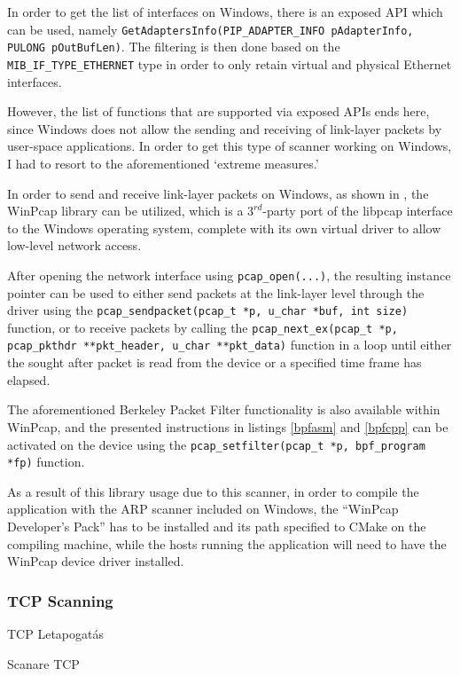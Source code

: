 \documentclass[a4paper,12pt]{article}
\newcommand\subsubsectionhu[1]{\addcontentsline{toc.hu}{subsubsection} {\protect\numberline{\thesubsubsection} #1}}
\newcommand\subsubsectionro[1]{\addcontentsline{toc.ro}{subsubsection} {\protect\numberline{\thesubsubsection} #1}}
\begin{document}
	In order to get the list of interfaces on Windows, there is an exposed API which can be used, namely \texttt{GetAdaptersInfo(PIP_ADAPTER_INFO pAdapterInfo, PULONG pOutBufLen)}. The filtering is then done based on the \texttt{MIB_IF_TYPE_ETHERNET} type in order to only retain virtual and physical Ethernet interfaces.
	
	However, the list of functions that are supported via exposed APIs ends here, since Windows does not allow the sending and receiving of link-layer packets by user-space applications. In order to get this type of scanner working on Windows, I had to resort to the aforementioned `extreme measures.'
	
	In order to send and receive link-layer packets on Windows, as shown in \cite{xing10}, the WinPcap library can be utilized, which is a $3^{rd}$-party port of the libpcap interface to the Windows operating system, complete with its own virtual driver to allow low-level network access.
	
	After opening the network interface using \texttt{pcap_open(...)}, the resulting instance pointer can be used to either send packets at the link-layer level through the driver using the \texttt{pcap_sendpacket(pcap_t *p, u_char *buf, int size)} function, or to receive packets by calling the \texttt{pcap_next_ex(pcap_t *p, pcap_pkthdr **pkt_header, u_char **pkt_data)} function in a loop until either the sought after packet is read from the device or a specified time frame has elapsed.
	
	The aforementioned Berkeley Packet Filter functionality is also available within WinPcap, and the presented instructions in listings \ref{bpfasm} and \ref{bpfcpp} can be activated on the device using the \texttt{pcap_setfilter(pcap_t *p, bpf_program *fp)} function.
	
	As a result of this library usage due to this scanner, in order to compile the application with the ARP scanner included on Windows, the ``WinPcap Developer's Pack'' has to be installed and its path specified to CMake on the compiling machine, while the hosts running the application will need to have the WinPcap device driver installed.

\subsubsection{TCP Scanning} \label{ssec:tcpscan}
\subsubsectionhu{TCP Letapogatás} \subsubsectionro{Scanare TCP}
\end{document}
